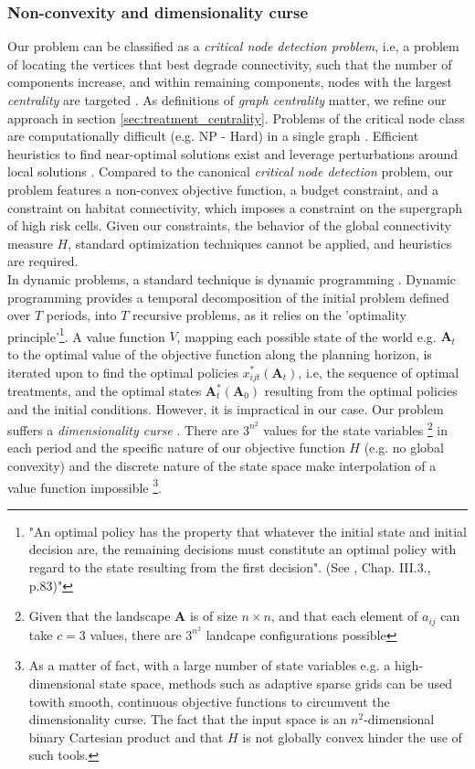 \subsubsection{Non-convexity and dimensionality curse}
Our problem can be classified as a \textit{critical node detection problem}, i.e, a problem of locating the vertices that best degrade connectivity, such that the number of components increase, and within remaining components, nodes with the largest \textit{centrality} are targeted \citep{ARULSELVAN20092193}. As definitions of \textit{graph centrality} matter, we refine our approach in section \ref{sec:treatment_centrality}.
Problems of the critical node class are computationally difficult (e.g. NP - Hard) in a single graph \citep{ARULSELVAN20092193, matsypura_wildfire_2018}. Efficient heuristics to find near-optimal solutions exist and leverage perturbations around local solutions \citep{ARULSELVAN20092193, Zhou2017}. Compared to the canonical \textit{critical node detection} problem, our problem features a non-convex objective function, a budget constraint, and a constraint on habitat connectivity, which imposes a constraint on the supergraph of high risk cells. Given our constraints, the behavior of the global connectivity measure $H$, standard optimization techniques cannot be applied, and heuristics are required. \\
In dynamic problems, a standard technique is dynamic programming \citep{Bellman}. Dynamic programming provides a temporal decomposition of the initial problem defined over $T$ periods, into $T$ recursive problems, as it relies on the 'optimality principle'\footnote{"An optimal policy has the property that whatever the initial state and initial decision are, the remaining decisions must constitute an optimal policy with regard to the state resulting from the first decision". (See \cite{Bellman}, Chap. III.3., p.83)"}. A value function $V$, mapping each possible state of the world e.g. $\mathbf{A}_t$ to the optimal value of the objective function along the planning horizon, is iterated upon to find the optimal policies $x_{ijt}^*(\mathbf{A}_t)$, i.e, the sequence of optimal treatments, and the optimal states $\mathbf{A}_t^*(\mathbf{A}_0)$ resulting from the optimal policies and the initial conditions.
However, it is impractical in our case. Our problem suffers a \textit{dimensionality curse} \citep{Bellman}. There are $3^{n^2}$ values for the state variables \footnote{Given that the landscape $\mathbf{A}$ is of size $n\times n$, and that each element of $a_{ij}$ can take $c=3$ values, there are $3^{n^2}$ landcape configurations possible} in each period and the specific nature of our objective function $H$ (e.g. no global convexity) and the discrete nature of the state space make interpolation of a value function impossible \footnote{As a matter of fact, with a large number of state variables e.g. a high-dimensional state space, methods such as adaptive sparse grids can be used towith smooth, continuous objective functions \citep{brumm_adaptive_2017} to circumvent the dimensionality curse. The fact that the input space is an $n^2$-dimensional binary Cartesian product and that $H$ is not globally convex hinder the use of such tools.}.
